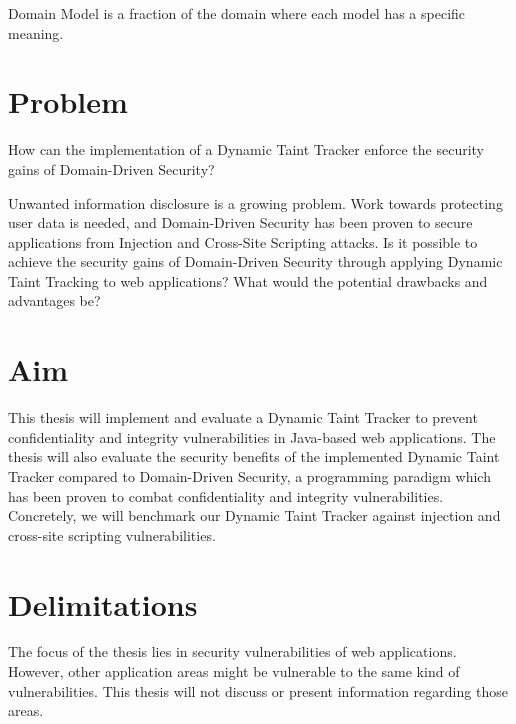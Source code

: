 \begin{definition}{Domain Model}
    is a fraction of the domain where each model has a specific meaning.
    \\
\end{definition}



\section{Problem}
\label{Problem}


\begin{chapquote}{}
    How can the implementation of a Dynamic Taint Tracker enforce the security gains of Domain-Driven Security?
\end{chapquote}

\noindent
Unwanted information disclosure is a growing problem. Work towards protecting user data is needed, and Domain-Driven Security has been proven to secure applications from Injection and Cross-Site Scripting attacks. Is it possible to achieve the security gains of Domain-Driven Security through applying Dynamic Taint Tracking to web applications? What would the potential drawbacks and advantages be?



\section{Aim}
\label{Aim}
This thesis will implement and evaluate a Dynamic Taint Tracker to prevent confidentiality and integrity vulnerabilities in Java-based web applications. The thesis will also evaluate the security benefits of the implemented Dynamic Taint Tracker compared to Domain-Driven Security, a programming paradigm which has been proven to combat confidentiality and integrity vulnerabilities. Concretely, we will benchmark our Dynamic Taint Tracker against injection and cross-site scripting vulnerabilities.



\section{Delimitations}
\label{Delimitations}
The focus of the thesis lies in security vulnerabilities of web applications. However, other application areas might be vulnerable to the same kind of vulnerabilities.  This thesis will not discuss or present information regarding those areas.

